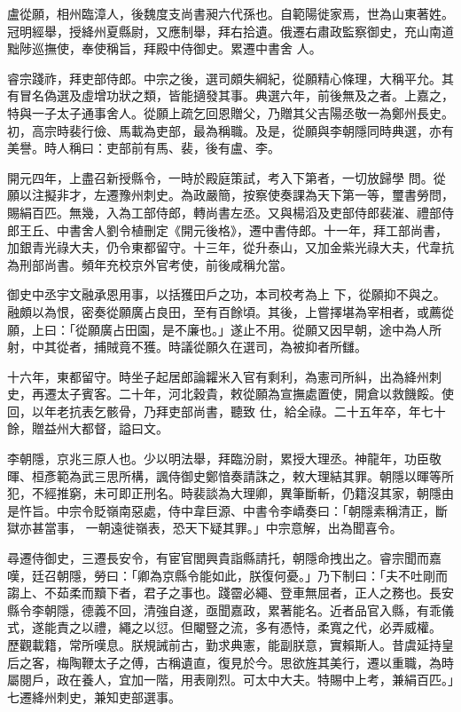 \begin{pinyinscope}
 盧從願，相州臨漳人，後魏度支尚書昶六代孫也。自範陽徙家焉，世為山東著姓。冠明經舉，授絳州夏縣尉，又應制舉，拜右拾遺。俄遷右肅政監察御史，充山南道黜陟巡撫使，奉使稱旨，拜殿中侍御史。累遷中書舍
 人。



 睿宗踐祚，拜吏部侍郎。中宗之後，選司頗失綱紀，從願精心條理，大稱平允。其有冒名偽選及虛增功狀之類，皆能擿發其事。典選六年，前後無及之者。上嘉之，特與一子太子通事舍人。從願上疏乞回恩贈父，乃贈其父吉陽丞敬一為鄭州長史。初，高宗時裴行儉、馬載為吏部，最為稱職。及是，從願與李朝隱同時典選，亦有美譽。時人稱曰：吏部前有馬、裴，後有盧、李。



 開元四年，上盡召新授縣令，一時於殿庭策試，考入下第者，一切放歸學
 問。從願以注擬非才，左遷豫州刺史。為政嚴簡，按察使奏課為天下第一等，璽書勞問，賜絹百匹。無幾，入為工部侍郎，轉尚書左丞。又與楊滔及吏部侍郎裴漼、禮部侍郎王丘、中書舍人劉令植刪定《開元後格》，遷中書侍郎。十一年，拜工部尚書，加銀青光祿大夫，仍令東都留守。十三年，從升泰山，又加金紫光祿大夫，代韋抗為刑部尚書。頻年充校京外官考使，前後咸稱允當。



 御史中丞宇文融承恩用事，以括獲田戶之功，本司校考為上
 下，從願抑不與之。融頗以為恨，密奏從願廣占良田，至有百餘頃。其後，上嘗擇堪為宰相者，或薦從願，上曰：「從願廣占田園，是不廉也。」遂止不用。從願又因早朝，途中為人所射，中其從者，捕賊竟不獲。時議從願久在選司，為被抑者所讎。



 十六年，東都留守。時坐子起居郎論糶米入官有剩利，為憲司所糾，出為絳州刺史，再遷太子賓客。二十年，河北穀貴，敕從願為宣撫處置使，開倉以救饑餒。使回，以年老抗表乞骸骨，乃拜吏部尚書，聽致
 仕，給全祿。二十五年卒，年七十餘，贈益州大都督，謚曰文。



 李朝隱，京兆三原人也。少以明法舉，拜臨汾尉，累授大理丞。神龍年，功臣敬暉、桓彥範為武三思所構，諷侍御史鄭愔奏請誅之，敕大理結其罪。朝隱以暉等所犯，不經推窮，未可即正刑名。時裴談為大理卿，異筆斷斬，仍籍沒其家，朝隱由是忤旨。中宗令貶嶺南惡處，侍中韋巨源、中書令李嶠奏曰：「朝隱素稱清正，斷獄亦甚當事，
 一朝遠徙嶺表，恐天下疑其罪。」中宗意解，出為聞喜令。



 尋遷侍御史，三遷長安令，有宦官閭興貴詣縣請托，朝隱命拽出之。睿宗聞而嘉嘆，廷召朝隱，勞曰：「卿為京縣令能如此，朕復何憂。」乃下制曰：「夫不吐剛而謅上、不茹柔而黷下者，君子之事也。踐霤必繩、登車無屈者，正人之務也。長安縣令李朝隱，德義不回，清強自遂，亟聞嘉政，累著能名。近者品官入縣，有乖儀式，遂能責之以禮，繩之以愆。但閹豎之流，多有憑恃，柔寬之代，必弄威權。
 歷觀載籍，常所嘆息。朕規誡前古，勤求典憲，能副朕意，實賴斯人。昔虞延持皇后之客，梅陶鞭太子之傅，古稱遺直，復見於今。思欲旌其美行，遷以重職，為時屬閱戶，政在養人，宜加一階，用表剛烈。可太中大夫。特賜中上考，兼絹百匹。」七遷絳州刺史，兼知吏部選事。




\end{pinyinscope}
